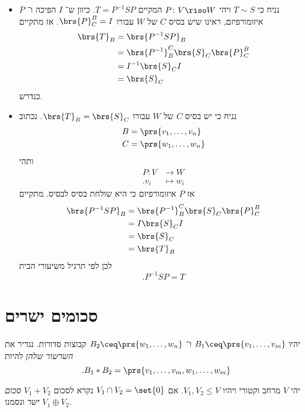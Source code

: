 \documentclass[a4paper,10pt,oneside,openany]{article}
\begin{document}
\begin{solution}
\begin{itemize}
\item נניח כי
$T \sim S$
ויהי
$P \colon V \riso W$
המקיים
$T = P^{-1} S P$.
כיוון ש־%
$I$
הפיכה ו־%
$P$
איזומורפיזם,
ראינו שיש בסיס
$C$
של
$W$
עבורו
$\brs{P}^B_C = I$.
אז מתקיים
\begin{align*}
\brs{T}_B &= \brs{P^{-1} S P}_B
\\&= \brs{P^{-1}}_B^C \brs{S}_C \brs{P}^B_C
\\&= I^{-1} \brs{S}_C I
\\&= \brs{S}_C
\end{align*}
כנדרש.
\item
נניח כי יש בסיס
$C$
של
$W$
עבורו
$\brs{T}_B = \brs{S}_C$.
נכתוב
\begin{align*}
B &= \prs{v_1, \ldots, v_n} \\
C &= \prs{w_1, \ldots, w_n}
\end{align*}
ותהי
\begin{align*}
P \colon V &\to W \\
\text{.} v_i &\mapsto w_i
\end{align*}
אז
$P$
איזומורפיזם כי היא שולחת בסיס לבסיס.
מתקיים
\begin{align*}
\brs{P^{-1} S P}_B &= \brs{P^{-1}}^C_B \brs{S}_C \brs{P}^B_C
\\&= I \brs{S}_C I
\\&= \brs{S}_C
\\&= \brs{T}_B
\end{align*}
לכן לפי תרגיל משיעורי הבית
\[\text{.} P^{-1} S P = T\]
\end{itemize}
\end{solution}

\section{סכומים ישרים}

\begin{definition}
יהיו
$B_1 \ceq \prs{v_1, \ldots, v_m}$
ו־%
$B_2 \ceq \prs{w_1, \ldots, w_n}$
קבוצות סדורות.
נגדיר את
\emph{השרשור שלהן}
להיות
\[\text{.} B_1 * B_2 = \prs{v_1, \ldots, v_m, w_1, \ldots, w_m}\]
\end{definition}

\begin{definition}
יהי
$V$
מרחב וקטורי ויהיו
$V_1, V_2 \leq V$.
אם
$V_1 \cap V_2 = \set{0}$
נקרא לסכום
$V_1 + V_2$
\emph{סכום ישר}
ונסמנו
$V_1 \oplus V_2$.
\end{definition}
\end{document}
